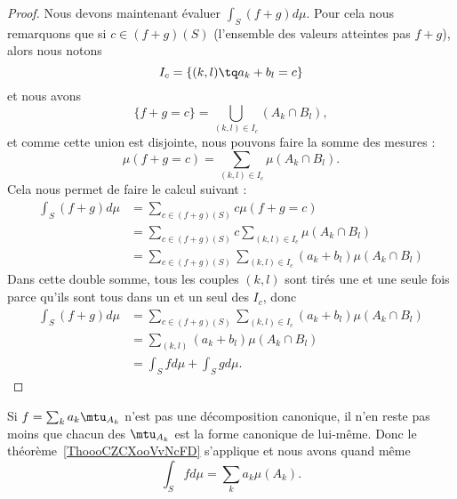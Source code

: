 \begin{proof}
    Nous devons maintenant évaluer \( \int_S(f+g)d\mu\). Pour cela nous remarquons que si \( c\in (f+g)(S)\) (l'ensemble des valeurs atteintes pas \( f+g\)), alors nous notons
    \begin{equation}
        I_c=\{ (k,l)\tq a_k+b_l=c \}
    \end{equation}
    et nous avons
    \begin{equation}
        \{ f+g=c \}=\bigcup_{(k,l)\in I_c}(A_k\cap B_l),
    \end{equation}
    et comme cette union est disjointe, nous pouvons faire la somme des mesures :
    \begin{equation}
        \mu(f+g=c)=\sum_{(k,l)\in I_c}\mu(A_k\cap B_l).
    \end{equation}
    Cela nous permet de faire le calcul suivant :
    \begin{subequations}
        \begin{align}
            \int_S(f+g)d\mu&=\sum_{c\in (f+g)(S)}c\mu(f+g=c)\\
            &=\sum_{c\in(f+g)(S)}c\sum_{(k,l)\in I_c}\mu(A_k\cap B_l)\\
            &=\sum_{c\in(f+g)(S)}\sum_{(k,l)\in I_c} (a_k+b_l) \mu(A_k\cap B_l)
        \end{align}
    \end{subequations}
    Dans cette double somme, tous les couples \( (k,l)\) sont tirés une et une seule fois parce qu'ils sont tous dans un et un seul des \( I_c\), donc
    \begin{subequations}
        \begin{align}
            \int_S(f+g)d\mu&= \sum_{c\in(f+g)(S)}\sum_{(k,l)\in I_c} (a_k+b_l) \mu(A_k\cap B_l)\\
            &=\sum_{(k,l)}(a_k+b_l)\mu(A_k\cap B_l)\\
            &=\int_Sfd\mu+\int_Sgd\mu.
        \end{align}
    \end{subequations}
\end{proof}

\begin{remark}
    Si \( f=\sum_ka_k\mtu_{A_k}\) n'est pas une décomposition canonique, il n'en reste pas moins que chacun des \( \mtu_{A_k}\) est la forme canonique de lui-même. Donc le théorème~\ref{ThoooCZCXooVvNcFD} s'applique et nous avons quand même
    \begin{equation}
        \int_Sfd\mu=\sum_ka_k\mu(A_k).
    \end{equation}
\end{remark}

